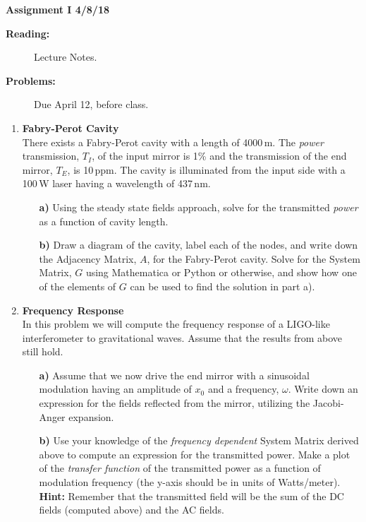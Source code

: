 \documentclass[11pt]{article}
\begin{document}
%
\centerline{\large\bf  \hfill Assignment I \hfill  4/8/18}

\medskip
\begin{description}
\item[{\bf Reading:}] Lecture Notes. \\
\item[{\bf Problems:} \hfill ] Due April 12, before class.
\end{description}


\medskip

\begin{enumerate}

\item
{\bf Fabry-Perot Cavity} \\
There exists a Fabry-Perot cavity with a length of 4000\,m. The \emph{power} transmission, $T_I$, of the input mirror is 1\% and the transmission of the end mirror, $T_E$, is 10\,ppm. The cavity is illuminated from the input side with a 100\,W laser having a wavelength of 437\,nm.
\begin{itemize}

\item[\bf a)] Using the steady state fields approach, solve for the transmitted \emph{power} as a function of cavity length.

\item[\bf b)] Draw a diagram of the cavity, label each of the nodes, and write down the Adjacency Matrix, $A$, for the Fabry-Perot cavity. Solve for the System Matrix, $G$ using Mathematica or Python or otherwise, and show how one of the elements of $G$ can be used to find the solution in part a).
\end{itemize}

\item
{\bf Frequency Response} \\
In this problem we will compute the frequency response of a LIGO-like interferometer to gravitational waves. Assume that the results from above still hold.
\begin{itemize}

\item[\bf a)] Assume that we now drive the end mirror with a sinusoidal modulation having an amplitude of $x_0$ and a frequency, $\omega$. Write down an expression for the fields reflected from the mirror, utilizing the Jacobi-Anger expansion.

\item[\bf b)] Use your knowledge of the \emph{frequency dependent} System Matrix derived above to compute an expression for the transmitted power. Make a plot of the \emph{transfer function} of the transmitted power as a function of modulation frequency (the y-axis should be in units of Watts/meter).
\textbf{Hint:} Remember that the transmitted field will be the sum of the DC fields (computed above) and the AC fields.


\end{itemize}
\end{enumerate}
\end{document}

